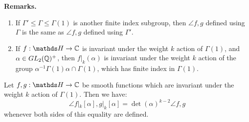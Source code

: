\documentclass[10pt,a4paper]{article}
\begin{document}
\textbf{Remarks.}
\begin{enumerate}
  \item If $\Gamma' \leq \Gamma \leq \Gamma(1)$ is another finite index subgroup, then $\angle{f, g}$ defined using $\Gamma$ is the same as $\angle{f,g}$ defined using $\Gamma'$.
  \item If $f:\H \to \C$ is invariant under the weight $k$ action of $\Gamma(1)$, and $\alpha \in GL_2(\mathbb{Q})^+$, then $f|_k(\alpha)$ is invariant under the weight $k$ action of the group $\alpha^{-1}\Gamma(1)\alpha \cap \Gamma(1)$, which has finite index in $\Gamma(1)$.
\end{enumerate}
\begin{proposition}
  Let $f, g:\H \to \C$ be smooth functions which are invariant under the weight $k$ action of $\Gamma(1)$. Then we have:
  \[\angle{f|_k[\alpha], g|_k[\alpha]} = \det(\alpha)^{k-2}\angle{f,g}\]
  whenever both sides of this equality are defined.
\end{proposition}
\end{document}

